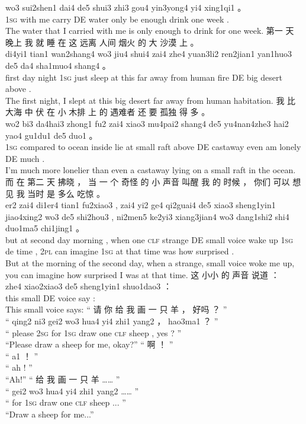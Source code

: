 \documentclass[UTF8]{ctexart}
\begin{document}
\begin{exe}
wo3 sui2shen1 dai4 de5 shui3 zhi3 gou4 yin3yong4 yi4 xing1qi1 。
\\
\textsc{1sg} {with me} carry DE water only {be enough} drink one week .
\\
\trans The water that I carried with me is only enough to drink for one week. 
\ex
\glll
第一 天 晚上 我 就 睡 在 这 远离 人间 烟火 的 大 沙漠 上 。
\\
di4yi1 tian1 wan2shang4 wo3 jiu4 shui4 zai4 zhe4 yuan3li2 ren2jian1 yan1huo3 de5 da4 sha1muo4 shang4 。
\\
first day night \textsc{1sg} just sleep at this {far away from} human fire DE big desert above .
\\
\trans The first night, I slept at this big desert far away from human habitation.
\ex
\glll
我 比 大海 中 伏 在 小 木排 上 的 遇难者 还 要 孤独 得 多 。
\\
wo2 bi3 da4hai3 zhong1 fu2 zai4 xiao3 mu4pai2 shang4 de5 yu4nan4zhe3 hai2 yao4 gu1du1 de5 duo1 。
\\
\textsc{1sg} {compared to} ocean inside lie at small raft above DE castaway even am lonely DE much .
\\
\trans I'm much more lonelier than even a castaway lying on a small raft in the ocean. 
\ex
\glll
而 在 第二 天 拂晓 ， 当 一 个 奇怪 的 小 声音 叫醒 我 的 时候 ， 你们 可以 想见 我 当时 是 多么 吃惊 。
\\
er2 zai4 di1er4 tian1 fu2xiao3 , zai4 yi2 ge4 qi2guai4 de5 xiao3 sheng1yin1 jiao4xing2 wo3 de5 shi2hou3 , ni2men5 ke2yi3 xiang3jian4 wo3 dang1shi2 shi4 duo1ma5 chi1jing1 。
\\
but at second day morning , when one \textsc{clf} strange DE small voice {wake up} \textsc{1sg} de time , {\textsc{2pl}} can imagine \textsc{1sg} {at that time} was how surprised . 
\\
\trans But at the morning of the second day, when a strange, small voice woke me up, you can imagine how surprised I was at that time. 
\ex
\glll
这 小小 的 声音 说道 ：
\\
zhe4 xiao2xiao3 de5 sheng1yin1 shuo1dao3 ：
\\
this small DE voice say :
\\
\trans This small voice says:
\ex
\glll
“ 请 你 给 我 画 一 只 羊 ， 好吗 ？ ”
\\
“ qing2 ni3 gei2 wo3 hua4 yi4 zhi1 yang2 ， hao3ma1 ？ ”
\\
`` please \textsc{2sg} for \textsc{1sg} draw one \textsc{clf} sheep , yes ? ''
\\
\trans ``Please draw a sheep for me, okay?''
\ex
\glll
“ 啊 ！ ”
\\
“ a1 ！ ”
\\
`` ah ! ''
\\
\trans ``Ah!''
\ex
\glll
“ 给 我 画 一 只 羊 …… ”
\\
“ gei2 wo3 hua4 yi4 zhi1 yang2 …… ”
\\
`` for \textsc{1sg} draw one \textsc{clf} sheep ... ''
\\
\trans ``Draw a sheep for me...''
\end{exe}
\end{document}
